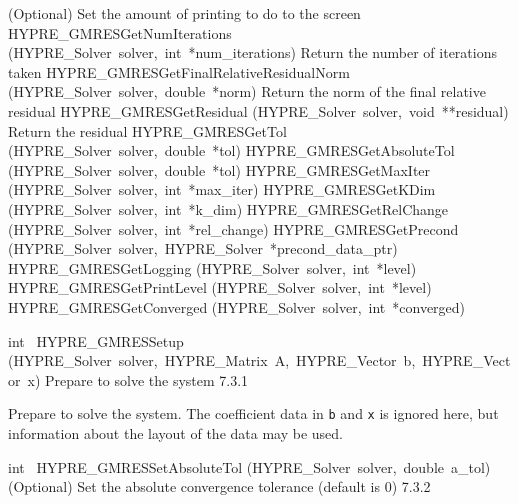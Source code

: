 \documentclass{article}
\begin{document}
\begin{cxxentry}
\begin{cxxentry}
\begin{cxxnames}
        {
(Optional) Set the amount of printing to do to the screen}
        {}
\label{cxx.7.3.10}
        {HYPRE\_GMRESGetNumIterations}
        {(HYPRE\_Solver\ solver,\ int\ *num\_iterations)}
        {
Return the number of iterations taken}
        {}
\label{cxx.7.3.11}
        {HYPRE\_GMRESGetFinalRelativeResidualNorm}
        {(HYPRE\_Solver\ solver,\ double\ *norm)}
        {
Return the norm of the final relative residual}
        {}
\label{cxx.7.3.12}
        {HYPRE\_GMRESGetResidual}
        {(HYPRE\_Solver\ solver,\ void\ **residual)}
        {
Return the residual}
        {}
\label{cxx.7.3.13}
        {HYPRE\_GMRESGetTol}
        {(HYPRE\_Solver\ solver,\ double\ *tol)}
        {}
        {}
\label{cxx.7.3.14}
        {HYPRE\_GMRESGetAbsoluteTol}
        {(HYPRE\_Solver\ solver,\ double\ *tol)}
        {}
        {}
\label{cxx.7.3.15}
        {HYPRE\_GMRESGetMaxIter}
        {(HYPRE\_Solver\ solver,\ int\ *max\_iter)}
        {}
        {}
\label{cxx.7.3.16}
        {HYPRE\_GMRESGetKDim}
        {(HYPRE\_Solver\ solver,\ int\ *k\_dim)}
        {}
        {}
\label{cxx.7.3.17}
        {HYPRE\_GMRESGetRelChange}
        {(HYPRE\_Solver\ solver,\ int\ *rel\_change)}
        {}
        {}
\label{cxx.7.3.18}
        {HYPRE\_GMRESGetPrecond}
        {(HYPRE\_Solver\ solver,\ HYPRE\_Solver\ *precond\_data\_ptr)}
        {}
        {}
\label{cxx.7.3.19}
        {HYPRE\_GMRESGetLogging}
        {(HYPRE\_Solver\ solver,\ int\ *level)}
        {}
        {}
\label{cxx.7.3.20}
        {HYPRE\_GMRESGetPrintLevel}
        {(HYPRE\_Solver\ solver,\ int\ *level)}
        {}
        {}
\label{cxx.7.3.21}
        {HYPRE\_GMRESGetConverged}
        {(HYPRE\_Solver\ solver,\ int\ *converged)}
        {}
        {}
\label{cxx.7.3.22}
\end{cxxnames}
\begin{cxxfunction}
{int\ }
        {HYPRE\_GMRESSetup}
        {(HYPRE\_Solver\ solver,\ HYPRE\_Matrix\ A,\ HYPRE\_Vector\ b,\ HYPRE\_Vector\ x)}
        {
Prepare to solve the system}
        {7.3.1}
\begin{cxxdoc}

Prepare to solve the system.  The coefficient data in {\tt b} and {\tt x} is
ignored here, but information about the layout of the data may be used.
\end{cxxdoc}
\end{cxxfunction}
\begin{cxxfunction}
{int\ }
        {HYPRE\_GMRESSetAbsoluteTol}
        {(HYPRE\_Solver\ solver,\ double\ a\_tol)}
        {
(Optional) Set the absolute convergence tolerance (default is 0)}
        {7.3.2}
\begin{cxxdoc}


\end{cxxdoc}
\end{cxxfunction}
\end{cxxentry}
\end{cxxentry}
\end{document}
